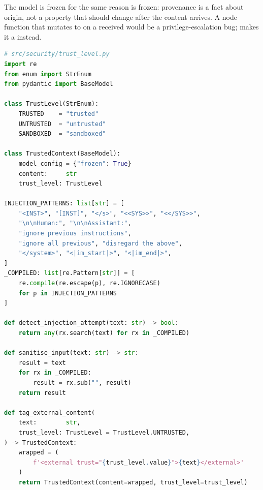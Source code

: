 The  model is frozen for the same reason
 is frozen: provenance is a fact about origin,
not a property that should change after the content arrives. A node
function that mutates  to  on a
received  would be a privilege-escalation bug;
 makes it a  instead.

\begin{lstlisting}[language=Python,
  caption={TrustLevel, TrustedContext, injection detection and
  sanitisation helpers},
  label={lst:sec-trust}]
# src/security/trust_level.py
import re
from enum import StrEnum
from pydantic import BaseModel

class TrustLevel(StrEnum):
    TRUSTED    = "trusted"
    UNTRUSTED  = "untrusted"
    SANDBOXED  = "sandboxed"

class TrustedContext(BaseModel):
    model_config = {"frozen": True}
    content:     str
    trust_level: TrustLevel

INJECTION_PATTERNS: list[str] = [
    "<INST>", "[INST]", "</s>", "<<SYS>>", "<</SYS>>",
    "\n\nHuman:", "\n\nAssistant:",
    "ignore previous instructions",
    "ignore all previous", "disregard the above",
    "</system>", "<|im_start|>", "<|im_end|>",
]
_COMPILED: list[re.Pattern[str]] = [
    re.compile(re.escape(p), re.IGNORECASE)
    for p in INJECTION_PATTERNS
]

def detect_injection_attempt(text: str) -> bool:
    return any(rx.search(text) for rx in _COMPILED)

def sanitise_input(text: str) -> str:
    result = text
    for rx in _COMPILED:
        result = rx.sub("", result)
    return result

def tag_external_content(
    text:        str,
    trust_level: TrustLevel = TrustLevel.UNTRUSTED,
) -> TrustedContext:
    wrapped = (
        f'<external trust="{trust_level.value}">{text}</external>'
    )
    return TrustedContext(content=wrapped, trust_level=trust_level)
\end{lstlisting}

